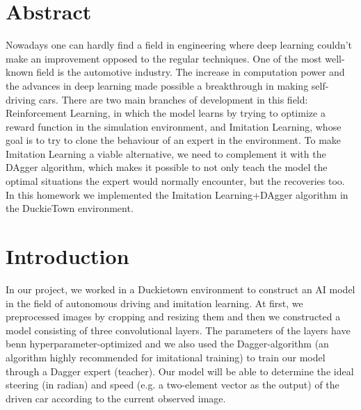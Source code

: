 \documentclass{article}
\begin{document}

\vspace*{2\baselineskip}
\vspace*{2\baselineskip}
\vspace*{2\baselineskip}

\section*{Abstract}
Nowadays one can hardly find a field in engineering where deep learning couldn’t make an improvement opposed to the regular techniques.
One of the most well-known field is the automotive industry. The increase in computation power and the advances in deep learning made possible a breakthrough in making self-driving cars. There are two main branches of development in this field: Reinforcement Learning, in which the model learns by trying to optimize a reward function in the simulation environment, and Imitation Learning, whose goal is to try to clone the behaviour of an expert in the environment.
To make Imitation Learning a viable alternative, we need to complement it with the DAgger algorithm, which makes it possible to not only teach the model the optimal situations the expert would normally encounter, but the recoveries too.
In this homework we implemented the Imitation Learning+DAgger algorithm in the DuckieTown environment.

\pagebreak


\section*{Introduction}
In our project, we worked in a Duckietown environment to construct an AI model in the field of autonomous driving and imitation learning. At first, we preprocessed images by cropping and resizing them and then  we constructed a model consisting of three convolutional layers. The parameters of the layers have benn hyperparameter-optimized and we also used the Dagger-algorithm (an algorithm highly recommended for imitational training) to train our model through a Dagger expert (teacher). Our model will be able to determine the ideal steering (in radian) and speed (e.g. a two-element vector as the output) of the driven car according to the current observed image.

\vspace*{2\baselineskip}

\end{document}
